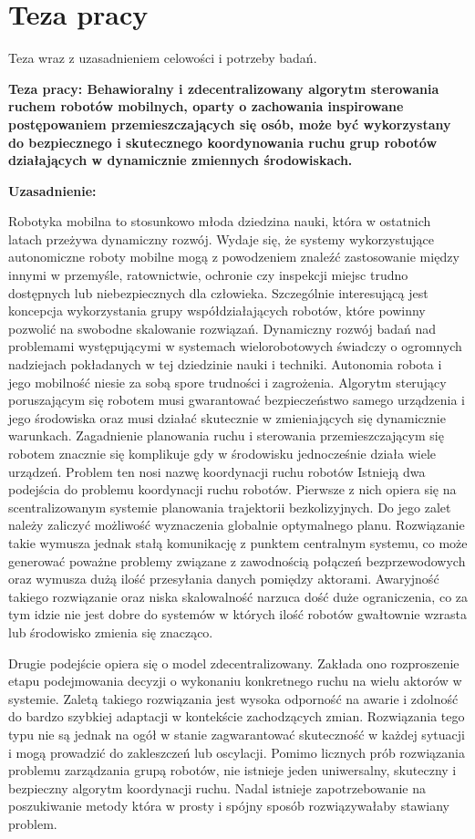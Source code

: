 \chapter{Teza pracy}

Teza wraz z uzasadnieniem celowości i potrzeby badań.


\textbf{Teza pracy:
Behawioralny i zdecentralizowany algorytm sterowania ruchem robotów mobilnych, oparty o zachowania inspirowane postępowaniem przemieszczających się osób, może być wykorzystany do bezpiecznego i skutecznego koordynowania ruchu grup robotów działających w dynamicznie zmiennych środowiskach. }


\textbf{Uzasadnienie:}

Robotyka mobilna to stosunkowo młoda dziedzina nauki, która w ostatnich latach przeżywa dynamiczny rozwój. Wydaje się, że systemy wykorzystujące autonomiczne roboty mobilne mogą z powodzeniem znaleźć zastosowanie między innymi w przemyśle, ratownictwie, ochronie czy inspekcji miejsc trudno dostępnych lub niebezpiecznych dla człowieka. Szczególnie interesującą jest koncepcja wykorzystania grupy współdziałających robotów, które powinny pozwolić na swobodne skalowanie rozwiązań. Dynamiczny rozwój badań nad problemami występującymi w systemach wielorobotowych świadczy o ogromnych nadziejach pokładanych w tej dziedzinie nauki i techniki.
Autonomia robota i jego mobilność niesie za sobą spore trudności i zagrożenia. Algorytm sterujący poruszającym się robotem musi gwarantować bezpieczeństwo samego urządzenia i jego środowiska oraz musi działać skutecznie w zmieniających się dynamicznie warunkach. Zagadnienie planowania ruchu i sterowania przemieszczającym się robotem znacznie się komplikuje gdy w środowisku jednocześnie działa wiele urządzeń. Problem ten nosi nazwę koordynacji ruchu robotów 
Istnieją dwa podejścia do problemu koordynacji ruchu robotów. Pierwsze z nich opiera się na scentralizowanym systemie planowania trajektorii bezkolizyjnych. Do jego zalet należy zaliczyć możliwość wyznaczenia globalnie optymalnego planu. Rozwiązanie takie wymusza jednak stałą komunikację z punktem centralnym systemu, co może generować poważne problemy związane z zawodnością połączeń bezprzewodowych oraz wymusza dużą ilość przesyłania danych pomiędzy aktorami. Awaryjność takiego rozwiązanie oraz niska skalowalność narzuca dość duże ograniczenia, co za tym idzie nie jest dobre do systemów w których ilość robotów gwałtownie wzrasta lub środowisko zmienia się znacząco.

Drugie podejście opiera się o model zdecentralizowany. Zakłada ono rozproszenie etapu podejmowania decyzji o wykonaniu konkretnego ruchu na wielu aktorów w systemie. Zaletą takiego rozwiązania jest wysoka odporność na awarie i zdolność do bardzo szybkiej adaptacji w kontekście zachodzących zmian. Rozwiązania tego typu nie są jednak na ogół w stanie zagwarantować skuteczność w każdej sytuacji i mogą prowadzić do zakleszczeń lub oscylacji.
Pomimo licznych prób rozwiązania problemu zarządzania grupą robotów, nie istnieje jeden uniwersalny, skuteczny i bezpieczny algorytm koordynacji ruchu. Nadal istnieje zapotrzebowanie na poszukiwanie metody która w prosty i spójny sposób rozwiązywałaby stawiany problem.

